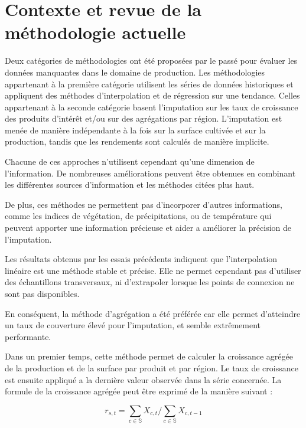 \documentclass[nojss]{jss}\usepackage{graphicx, color}
\begin{document}
\section{Contexte et revue de la m\'{e}thodologie actuelle}
Deux cat\'{e}gories de m\'{e}thodologies ont \'{e}t\'{e} propos\'{e}es
par le pass\'{e} pour \'{e}valuer les donn\'{e}es manquantes dans le
domaine de production. Les m\'{e}thodologies appartenant \`{a} la
premi\`{e}re cat\'{e}gorie utilisent les s\'{e}ries de donn\'{e}es
historiques et appliquent des m\'{e}thodes d'interpolation et de
r\'{e}gression sur une tendance.  Celles appartenant \`{a} la seconde
cat\'{e}gorie basent l'imputation sur les taux de croissance des
produits d'int\'{e}rêt et/ou sur des agr\'{e}gations par
r\'{e}gion. L'imputation est men\'{e}e de mani\`{e}re ind\'{e}pendante
\`{a} la fois sur la surface cultiv\'{e}e et sur la production, tandis
que les rendements sont calcul\'{e}s de mani\`{e}re implicite.


Chacune de ces approches n'utilisent cependant qu'une dimension de
l'information. De nombreuses am\'{e}liorations peuvent \^{e}tre obtenues
en combinant les diff\'{e}rentes sources d'information et les
m\'{e}thodes cit\'{e}es plus haut.

De plus, ces m\'{e}thodes ne permettent pas d'incorporer d'autres
informations, comme les indices de v\'{e}g\'{e}tation, de
pr\'{e}cipitations, ou de temp\'{e}rature qui peuvent apporter une
information pr\'{e}cieuse et aider a am\'{e}liorer la pr\'{e}cision de
l'imputation.


Les r\'{e}sultats obtenus par les essais pr\'{e}c\'{e}dents indiquent
que l'interpolation lin\'{e}aire est une m\'{e}thode stable et
pr\'{e}cise. Elle ne permet cependant pas d'utiliser des
\'{e}chantillons transversaux, ni d'extrapoler lorsque les points de
connexion ne sont pas disponibles.

En cons\'{e}quent, la m\'{e}thode d'agr\'{e}gation a \'{e}t\'{e}
pr\'{e}f\'{e}r\'{e}e car elle permet d'atteindre un taux de couverture
\'{e}lev\'{e} pour l'imputation, et semble extrêmement performante.


Dans un premier temps, cette m\'{e}thode permet de calculer la
croissance agr\'{e}g\'{e}e de la production et de la surface par
produit et par r\'{e}gion.  Le taux de croissance est ensuite
appliqu\'{e} a la derni\`{e}re valeur observ\'{e}e dans la s\'{e}rie
concern\'{e}e. La formule de la croissance agr\'{e}g\'{e}e peut être
exprim\'{e} de la mani\`{e}re suivant :

\begin{equation}
  \label{eq:aggregateGrowth}
  r_{s, t} = \sum_{c \in \mathbb{S}} X_{c, t}/\sum_{c \in \mathbb{S}} X_{c, t-1}
\end{equation}
\end{document}
